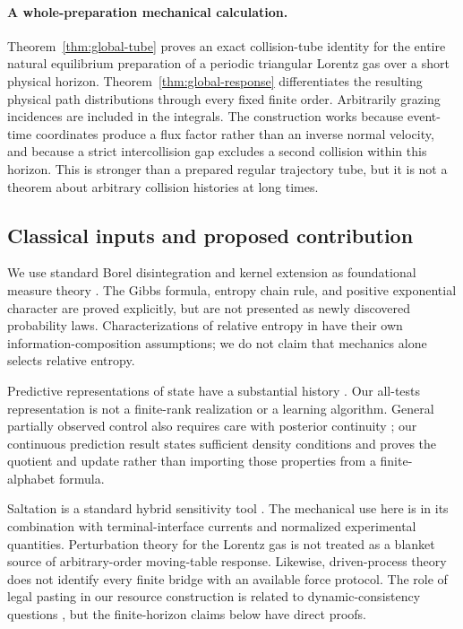 \paragraph{A whole-preparation mechanical calculation.}
Theorem~\ref{thm:global-tube} proves an exact collision-tube identity for the entire natural equilibrium preparation of a periodic triangular Lorentz gas over a short physical horizon. Theorem~\ref{thm:global-response} differentiates the resulting physical path distributions through every fixed finite order. Arbitrarily grazing incidences are included in the integrals. The construction works because event-time coordinates produce a flux factor rather than an inverse normal velocity, and because a strict intercollision gap excludes a second collision within this horizon. This is stronger than a prepared regular trajectory tube, but it is not a theorem about arbitrary collision histories at long times.

\subsection{Classical inputs and proposed contribution}
We use standard Borel disintegration and kernel extension as foundational measure theory \cite{Kallenberg}. The Gibbs formula, entropy chain rule, and positive exponential character are proved explicitly, but are not presented as newly discovered probability laws. Characterizations of relative entropy in \cite{BaezFritz,GagnePanangaden} have their own information-composition assumptions; we do not claim that mechanics alone selects relative entropy.

Predictive representations of state have a substantial history \cite{LittmanSuttonSingh}. Our all-tests representation is not a finite-rank realization or a learning algorithm. General partially observed control also requires care with posterior continuity \cite{FeinbergEtAl}; our continuous prediction result states sufficient density conditions and proves the quotient and update rather than importing those properties from a finite-alphabet formula.

Saltation is a standard hybrid sensitivity tool \cite{KongEtAl}. The mechanical use here is in its combination with terminal-interface currents and normalized experimental quantities. Perturbation theory for the Lorentz gas \cite{DemersZhang} is not treated as a blanket source of arbitrary-order moving-table response. Likewise, driven-process theory \cite{ChetriteTouchette,ChetriteTouchetteControl} does not identify every finite bridge with an available force protocol. The role of legal pasting in our resource construction is related to dynamic-consistency questions \cite{EpsteinSchneider}, but the finite-horizon claims below have direct proofs.

